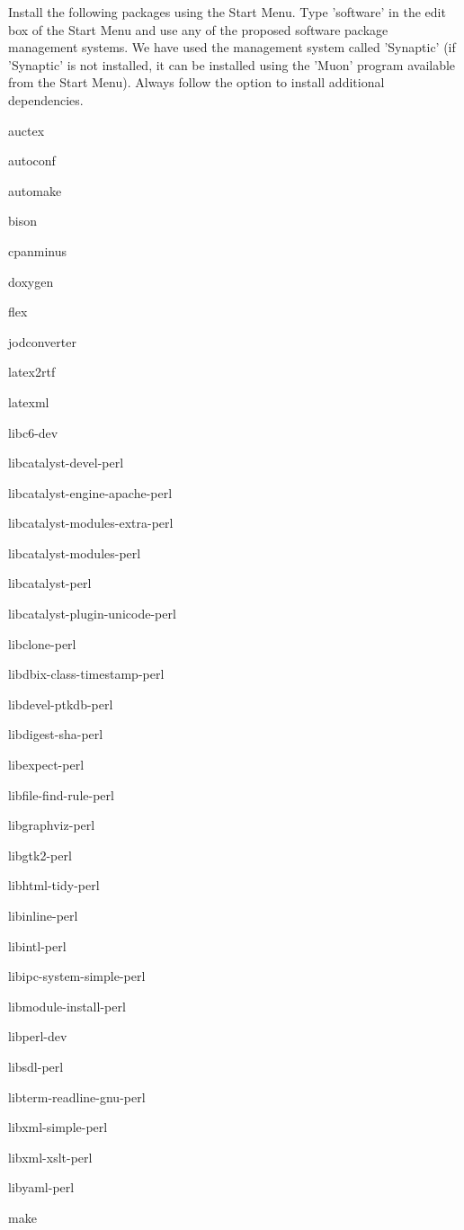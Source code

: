 \documentclass[12pt]{article}
\begin{document}
Install the following packages using the Start Menu.  Type 'software'
in the edit box of the Start Menu and use any of the proposed software
package management systems.  We have used the management system called
'Synaptic' (if 'Synaptic' is not installed, it can be installed using
the 'Muon' program available from the Start Menu).  Always follow the
option to install additional dependencies.
\begin{description} 
\item auctex
\item autoconf
\item automake
\item bison
\item cpanminus
\item doxygen
\item flex
\item jodconverter
\item latex2rtf
\item latexml
\item libc6-dev
\item libcatalyst-devel-perl
\item libcatalyst-engine-apache-perl
\item libcatalyst-modules-extra-perl
\item libcatalyst-modules-perl
\item libcatalyst-perl

\item libcatalyst-plugin-unicode-perl

\item libclone-perl
\item libdbix-class-timestamp-perl
\item libdevel-ptkdb-perl
\item libdigest-sha-perl
\item libexpect-perl
\item libfile-find-rule-perl
\item libgraphviz-perl
\item libgtk2-perl
\item libhtml-tidy-perl
\item libinline-perl
\item libintl-perl
\item libipc-system-simple-perl
\item libmodule-install-perl
\item libperl-dev
\item libsdl-perl
\item libterm-readline-gnu-perl
\item libxml-simple-perl
\item libxml-xslt-perl
\item libyaml-perl
\item make


\end{description}
\end{document}
